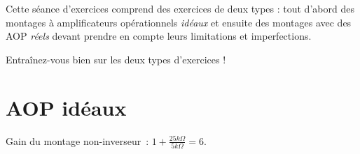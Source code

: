 \documentclass{../../template/tp}
\author{GEI}
\begin{document}

Cette séance d'exercices comprend des exercices de deux types : tout d'abord des montages à amplificateurs opérationnels \textit{idéaux} et ensuite des montages avec des AOP \textit{réels} devant prendre en compte leurs limitations et imperfections.

Entraînez-vous bien sur les deux types d'exercices !

\section{AOP idéaux}

{
    Gain du montage non-inverseur~: $ 1 + \frac{25 k\Omega}{5 k\Omega} = 6$.
}
\end{document}
